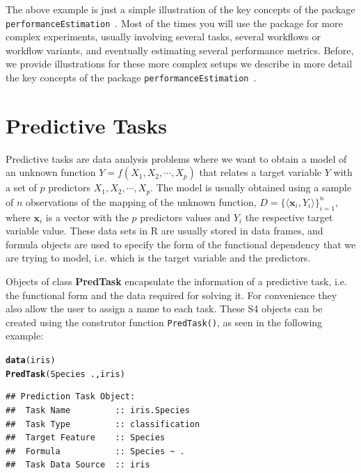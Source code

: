 \documentclass[10pt,a4paper]{article}\usepackage[]{graphicx}\usepackage[]{color}
\makeatletter
\newcommand{\hlopt}[1]{\textcolor[rgb]{0,0,0}{#1}}%
\newcommand{\hlstd}[1]{\textcolor[rgb]{0.345,0.345,0.345}{#1}}%
\newcommand{\hlkwd}[1]{\textcolor[rgb]{0.737,0.353,0.396}{\textbf{#1}}}%
\newenvironment{kframe}{%
 \def\at@end@of@kframe{}%
 \ifinner\ifhmode%
  \def\at@end@of@kframe{\end{minipage}}%
  \begin{minipage}{\columnwidth}%
 \fi\fi%
 \def\FrameCommand##1{\hskip\@totalleftmargin \hskip-\fboxsep
 \colorbox{shadecolor}{##1}\hskip-\fboxsep
     \hskip-\linewidth \hskip-\@totalleftmargin \hskip\columnwidth}%
 \MakeFramed {\advance\hsize-\width
   \@totalleftmargin\z@ \linewidth\hsize
   \@setminipage}}%
 {\par\unskip\endMakeFramed%
 \at@end@of@kframe}
\newenvironment{knitrout}{}{} %
\newcommand{\PE}{package \texttt{performanceEstimation}\ }
\makeatother
\begin{document}

The above  example is just a simple illustration of the key concepts of the \PE. Most of the times you will use the package for more complex experiments, usually involving several tasks, several workflows or workflow variants, and eventually estimating several performance metrics. Before, we provide illustrations for these more complex setups we describe in more detail the key concepts of the \PE.


\section{Predictive Tasks}

Predictive tasks are data analysis problems where we want to obtain a
model of an unknown function $Y=f(X_1, X_2, \cdots, X_p)$ that relates
a target variable $Y$ with a set of $p$ predictors $X_1, X_2, \cdots,
X_p$. The model is usually obtained using a sample of $n$ observations
of the mapping of the unknown function, $D=\{\langle \mathbf{x}_i,
Y_i\rangle\}_{i=1}^n$, where $\mathbf{x}_i$ is a vector with the $p$
predictors values and $Y_i$ the respective target variable value.  These data sets in R are usually stored in data
frames, and formula objects are used to specify the form of the
functional dependency that we are trying to model, i.e. which is the
target variable and the predictors.

Objects of class \textbf{PredTask} encapsulate the information of a
predictive task, i.e. the functional form and the data required for
solving it. For convenience they also allow the user to assign a name
to each task. These S4 objects can be created using the construtor
function \texttt{PredTask()}, as seen in the following example:

\begin{knitrout}\footnotesize
{}\color{fgcolor}\begin{kframe}
\begin{alltt}
\hlkwd{data}\hlstd{(iris)}
\hlkwd{PredTask}\hlstd{(Species} \hlopt{~} \hlstd{.,iris)}
\end{alltt}
\begin{verbatim}
## Prediction Task Object:
## 	Task Name         :: iris.Species 
## 	Task Type         :: classification 
## 	Target Feature    :: Species 
## 	Formula           :: Species ~ .
## 	Task Data Source  :: iris
\end{verbatim}
\end{kframe}
\end{knitrout}
\end{document}
